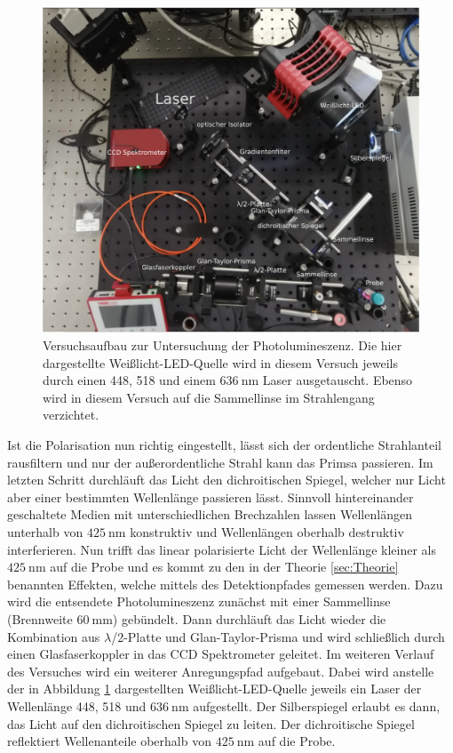 \begin{figure}[hbtp]
	\centering
	\includegraphics[width=\textwidth]{Abb/aufbau.png}
	\caption{Versuchsaufbau \cite{flex} zur Untersuchung der Photolumineszenz. Die
    hier dargestellte Weißlicht-LED-Quelle wird in diesem Versuch jeweils durch einen
    448, 518 und einem $\SI{636}{\nano\meter}$ Laser ausgetauscht. Ebenso wird in diesem
    Versuch auf die Sammellinse im Strahlengang verzichtet.}
	\label{fig:aufbau}
\end{figure}
\noindent
Ist die Polarisation nun richtig eingestellt, lässt sich der ordentliche
Strahlanteil rausfiltern und nur der außerordentliche Strahl kann das Primsa
passieren. Im letzten Schritt durchläuft das Licht den dichroitischen Spiegel,
welcher nur Licht aber einer bestimmten Wellenlänge passieren lässt. Sinnvoll hintereinander
geschaltete Medien mit unterschiedlichen Brechzahlen lassen Wellenlängen unterhalb von
$\SI{425}{\nano\meter}$ konstruktiv und Wellenlängen oberhalb destruktiv interferieren.
Nun trifft das linear polarisierte Licht der Wellenlänge kleiner als $\SI{425}{\nano\meter}$
auf die Probe und es kommt zu den in der Theorie \ref{sec:Theorie} benannten Effekten,
welche mittels des Detektionpfades gemessen werden. Dazu wird die entsendete
Photolumineszenz zunächst mit einer Sammellinse (Brennweite $\SI{60}{\milli\meter}$)
gebündelt. Dann durchläuft das Licht wieder die Kombination aus $\lambda$/2-Platte
und Glan-Taylor-Prisma und wird schließlich durch einen Glasfaserkoppler in das
CCD Spektrometer geleitet.
Im weiteren Verlauf des Versuches wird ein weiterer Anregungspfad aufgebaut. Dabei
wird anstelle der in Abbildung \ref{fig:aufbau} dargestellten Weißlicht-LED-Quelle
jeweils ein Laser der Wellenlänge 448, 518 und $\SI{636}{\nano\meter}$
aufgestellt. Der Silberspiegel erlaubt es dann, das Licht auf den dichroitischen Spiegel
zu leiten. Der dichroitische Spiegel reflektiert Wellenanteile oberhalb von
$\SI{425}{\nano\meter}$ auf die Probe.

